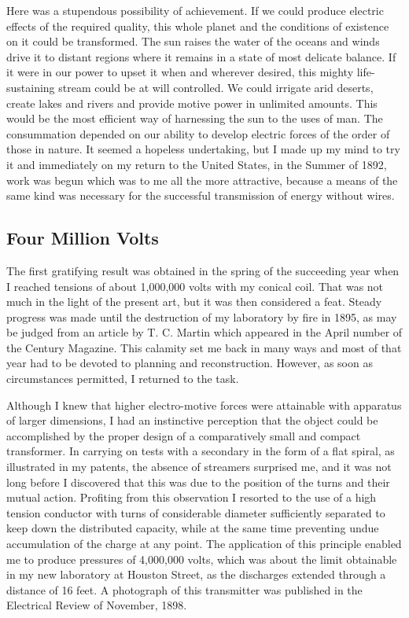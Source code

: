 \documentclass[a4paper,12pt,english,twoside,openright]{memoir}
\begin{document}
Here was a stupendous possibility of achievement.  If we could produce electric effects of the 
required quality, this whole planet and the conditions of existence on it could be transformed.  
The sun raises the water of the oceans and winds drive it to distant regions where it remains in a 
state of most delicate balance.  If it were in our power to upset it when and wherever desired, this 
mighty life-sustaining stream could be at will controlled.  We could irrigate arid deserts, create 
lakes and rivers and provide motive power in unlimited amounts.  This would be the most efficient 
way of harnessing the sun to the uses of man.  The consummation depended on our ability to 
develop electric forces of the order of those in nature.  It seemed a hopeless undertaking, but I 
made up my mind to try it and immediately on my return to the United States, in the Summer of 
1892, work was begun which was to me all the more attractive, because a means of the same 
kind was necessary for the successful transmission of energy without wires.  

\subsection{Four Million Volts}
The first gratifying result was obtained in the spring of the succeeding year when I reached 
tensions of about 1,000,000 volts with my conical coil.  That was not much in the light of the 
present art, but it was then considered a feat.  Steady progress was made until the destruction of 
my laboratory by fire in 1895, as may be judged from an article by T. C. Martin which appeared in 
the April number of the Century Magazine.  This calamity set me back in many ways and most of 
that year had to be devoted to planning and reconstruction.  However, as soon as circumstances 
permitted, I returned to the task.  

Although I knew that higher electro-motive forces were attainable with apparatus of larger 
dimensions, I had an instinctive perception that the object could be accomplished by the proper 
design of a comparatively small and compact transformer.  In carrying on tests with a secondary 
in the form of a flat spiral, as illustrated in my patents, the absence of streamers surprised me, 
and it was not long before I discovered that this was due to the position of the turns and their 
mutual action.  Profiting from this observation I resorted to the use of a high tension conductor 
with turns of considerable diameter sufficiently separated to keep down the distributed capacity, 
while at the same time preventing undue accumulation of the charge at any point.  The 
application of this principle enabled me to produce pressures of 4,000,000 volts, which was about 
the limit obtainable in my new laboratory at Houston Street, as the discharges extended through a 
distance of 16 feet.  A photograph of this transmitter was published in the Electrical Review of 
November, 1898.  
\end{document}
